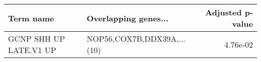 \begin{tabular}{llr}
\toprule
             Term name &       Overlapping genes... &  Adjusted p-value \\
\midrule
GCNP SHH UP LATE.V1 UP & NOP56,COX7B,DDX39A,...(10) &          4.76e-02 \\
\bottomrule
\end{tabular}
